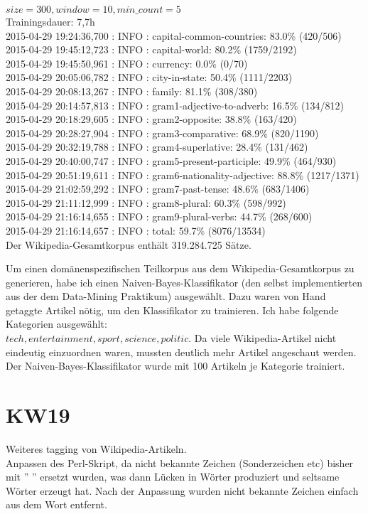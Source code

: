 \documentclass[11pt,a4paper]{article}
\begin{document}
$size=300, window=10, min\_count=5$
\\Trainingsdauer: 7,7h
\\2015-04-29 19:24:36,700 : INFO : capital-common-countries: 83.0\% (420/506)
\\2015-04-29 19:45:12,723 : INFO : capital-world: 80.2\% (1759/2192)
\\2015-04-29 19:45:50,961 : INFO : currency: 0.0\% (0/70)
\\2015-04-29 20:05:06,782 : INFO : city-in-state: 50.4\% (1111/2203)
\\2015-04-29 20:08:13,267 : INFO : family: 81.1\% (308/380)
\\2015-04-29 20:14:57,813 : INFO : gram1-adjective-to-adverb: 16.5\% (134/812)
\\2015-04-29 20:18:29,605 : INFO : gram2-opposite: 38.8\% (163/420)
\\2015-04-29 20:28:27,904 : INFO : gram3-comparative: 68.9\% (820/1190)
\\2015-04-29 20:32:19,788 : INFO : gram4-superlative: 28.4\% (131/462)
\\2015-04-29 20:40:00,747 : INFO : gram5-present-participle: 49.9\% (464/930)
\\2015-04-29 20:51:19,611 : INFO : gram6-nationality-adjective: 88.8\% (1217/1371)
\\2015-04-29 21:02:59,292 : INFO : gram7-past-tense: 48.6\% (683/1406)
\\2015-04-29 21:11:12,999 : INFO : gram8-plural: 60.3\% (598/992)
\\2015-04-29 21:16:14,655 : INFO : gram9-plural-verbs: 44.7\% (268/600)
\\2015-04-29 21:16:14,657 : INFO : total: 59.7\% (8076/13534)
\\Der Wikipedia-Gesamtkorpus enthält 319.284.725 Sätze.

Um einen domänenspezifischen Teilkorpus aus dem Wikipedia-Gesamtkorpus zu generieren, habe ich einen Naiven-Bayes-Klassifikator (den selbst implementierten aus der dem Data-Mining Praktikum) ausgewählt. Dazu waren von Hand getaggte Artikel nötig, um den Klassifikator zu trainieren. Ich habe folgende Kategorien ausgewählt: \\$tech, entertainment, sport, science, politic$. Da viele Wikipedia-Artikel nicht eindeutig einzuordnen waren, mussten deutlich mehr Artikel angeschaut werden. Der Naiven-Bayes-Klassifikator wurde mit 100 Artikeln je Kategorie trainiert.

\section*{KW19}
Weiteres tagging von Wikipedia-Artikeln.
\\Anpassen des Perl-Skript, da nicht bekannte Zeichen (Sonderzeichen etc) bisher mit '' '' ersetzt wurden, was dann Lücken in Wörter produziert und seltsame Wörter erzeugt hat. Nach der Anpassung wurden nicht bekannte Zeichen einfach aus dem Wort entfernt.
\end{document}
